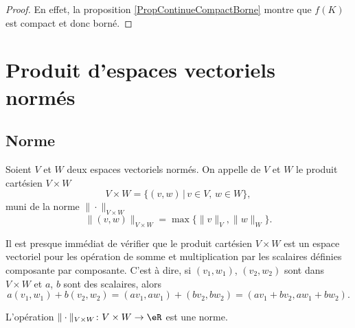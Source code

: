 \begin{proof}
	En effet, la proposition \ref{PropContinueCompactBorne} montre que $f(K)$ est compact et donc borné.
\end{proof}


\section{Produit d'espaces vectoriels normés}\label{sec_prod}

\subsection{Norme}

\begin{definition}  \label{DefFAJgTCE}
    Soient $V$ et $W$ deux espaces vectoriels normés. On appelle  de $V$ et $W$ le produit cartésien $V\times W$ 
    \begin{equation}
    V\times W=\{(v,w)\,|\, v\in V,\, w\in W\},
    \end{equation}
    muni de la norme $\|\cdot \|_{V\times W}$
    \begin{equation}	\label{EqNormeVxWmax}
        \|(v,w) \|_{V\times W}=\max\{\|v\|_{V},\|w\|_W\}.
    \end{equation}
\end{definition}
Il est presque immédiat de vérifier que le produit cartésien $V\times W$ est un espace vectoriel pour les opération de somme et multiplication par les scalaires définies composante par composante. C'est à dire,  si $(v_1,w_1)$, $(v_2,w_2)$ sont dans $V\times W$ et $a$, $b$ sont des scalaires, alors  
\begin{equation}
 a (v_1,w_1)+ b(v_2,w_2)=(av_1,aw_1)+ (bv_2,bw_2)=(av_1+bv_2,aw_1+bw_2).
\end{equation}

\begin{lemma}
	L'opération $\|\cdot \|_{V\times W}\colon V\times W\to \eR$ est une norme.
\end{lemma}

